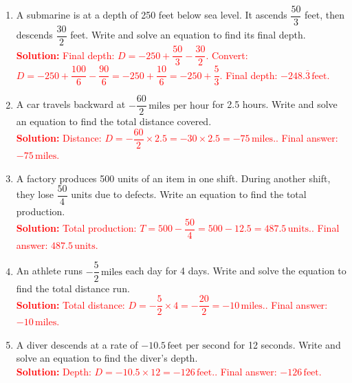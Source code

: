 \documentclass[11pt]{article}
\begin{document}
\begin{tcolorbox}[colframe=black!60, colback=white, 
coltitle=black, colbacktitle=black!15, fonttitle=\bfseries\Large, 
title=Problems, halign title=center, left=10pt, right=10pt, top=10pt, bottom=60pt]
\begin{enumerate}[start=9, itemsep=2em]
    \item A submarine is at a depth of 250 feet below sea level. It ascends \( \dfrac{50}{3} \) feet, then descends \( \dfrac{30}{2} \) feet. Write and solve an equation to find its final depth.\\
    \textcolor{red}{\textbf{Solution:} Final depth: \( D = -250 + \dfrac{50}{3} - \dfrac{30}{2} \). Convert: \( D = -250 + \dfrac{100}{6} - \dfrac{90}{6} = -250 + \dfrac{10}{6} = -250 + \dfrac{5}{3} \). Final depth: \( -248.\overline{3} \, \text{feet}. \)}

    \item A car travels backward at \( -\dfrac{60}{2} \, \text{miles per hour} \) for 2.5 hours. Write and solve an equation to find the total distance covered.\\
    \textcolor{red}{\textbf{Solution:} Distance: \( D = -\dfrac{60}{2} \times 2.5 = -30 \times 2.5 = -75 \, \text{miles}. \). Final answer: \( -75 \, \text{miles} \).}

    \item A factory produces 500 units of an item in one shift. During another shift, they lose \( \dfrac{50}{4} \) units due to defects. Write an equation to find the total production.\\
    \textcolor{red}{\textbf{Solution:} Total production: \( T = 500 - \dfrac{50}{4} = 500 - 12.5 = 487.5 \, \text{units}. \). Final answer: \( 487.5 \, \text{units}. \)}

    \item An athlete runs \( -\dfrac{5}{2} \, \text{miles} \) each day for 4 days. Write and solve the equation to find the total distance run.\\
    \textcolor{red}{\textbf{Solution:} Total distance: \( D = -\dfrac{5}{2} \times 4 = -\dfrac{20}{2} = -10 \, \text{miles}. \). Final answer: \( -10 \, \text{miles}. \)}

    \item A diver descends at a rate of \( -10.5 \, \text{feet per second} \) for 12 seconds. Write and solve an equation to find the diver's depth.\\
    \textcolor{red}{\textbf{Solution:} Depth: \( D = -10.5 \times 12 = -126 \, \text{feet}. \). Final answer: \( -126 \, \text{feet}. \)}
\end{enumerate}
\end{tcolorbox}
\end{document}
